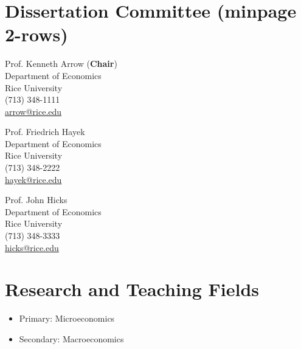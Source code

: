 \documentclass{article}[12]
\begin{document}
\section{Dissertation Committee (minpage 2-rows)}


\begin{minipage}{.5\textwidth}
Prof. Kenneth Arrow (\textbf{Chair}) \\
Department of Economics \\
Rice University \\
(713) 348-1111\\
\href{mailto:arrow@rice.edu}{arrow@rice.edu}
\end{minipage}%
%
%
\begin{minipage}{0.5\textwidth}
Prof. Friedrich Hayek \\
Department of Economics \\
Rice University \\
(713) 348-2222\\
\href{mailto:hayek@rice.edu}{hayek@rice.edu}
\end{minipage}

\vspace{1\baselineskip plus 10pt minus 10pt} 

\begin{minipage}{0.5\textwidth}
Prof. John Hicks \\
Department of Economics\\
Rice University \\
(713) 348-3333 \\
\href{mailto:hicks@rice.edu}{hicks@rice.edu}
\end{minipage}


\section{Research and Teaching Fields}

\begin{itemize}
    \item Primary: Microeconomics 
    \item Secondary: Macroeconomics 
\end{itemize}


\end{document}
